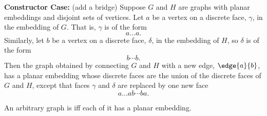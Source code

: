 \documentclass[quiz]{mcs}
\begin{document}
{\begin{minipage}[t]{6.5in}
\begin{definition*}
\textbf{Constructor Case:} (add a bridge) Suppose $G$ and $H$ are
graphs with planar embeddings and disjoint sets of vertices.
Let $a$ be a vertex on a discrete face, $\gamma$, in the embedding of
$G$.  That is, $\gamma$ is of the form
\[
a\dots a.
\]
Similarly, let $b$ be a vertex on a discrete face, $\delta$, in the
embedding of $H$, so $\delta$ is of the form
\[
b\cdots b.
\]
Then the graph obtained by connecting $G$ and $H$ with a new edge,
$\edge{a}{b}$, has a planar embedding whose discrete faces are the union of
the discrete faces of $G$ and $H$, except that faces $\gamma$ and $\delta$
are replaced by one new face
\[
a\dots ab\cdots ba.
\]

An arbitrary graph is  iff each of it
has a planar embedding.

\end{definition*}
\end{minipage}}
\end{document}
